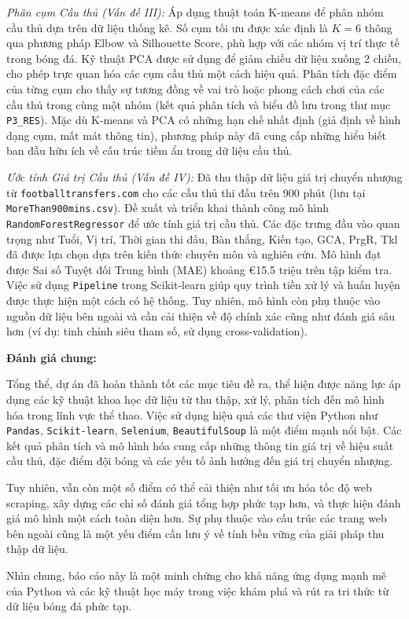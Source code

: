 \documentclass[12pt]{report}
\begin{document}
{\vspace{0.5em}
\noindent
\textit{Phân cụm Cầu thủ (Vấn đề III):} Áp dụng thuật toán K-means để phân nhóm cầu thủ dựa trên dữ liệu thống kê. Số cụm tối ưu được xác định là $K=6$ thông qua phương pháp Elbow và Silhouette Score, phù hợp với các nhóm vị trí thực tế trong bóng đá. Kỹ thuật PCA được sử dụng để giảm chiều dữ liệu xuống 2 chiều, cho phép trực quan hóa các cụm cầu thủ một cách hiệu quả. Phân tích đặc điểm của từng cụm cho thấy sự tương đồng về vai trò hoặc phong cách chơi của các cầu thủ trong cùng một nhóm (kết quả phân tích và biểu đồ lưu trong thư mục \texttt{P3\_RES}). Mặc dù K-means và PCA có những hạn chế nhất định (giả định về hình dạng cụm, mất mát thông tin), phương pháp này đã cung cấp những hiểu biết ban đầu hữu ích về cấu trúc tiềm ẩn trong dữ liệu cầu thủ.

\vspace{0.5em}
\noindent
\textit{Ước tính Giá trị Cầu thủ (Vấn đề IV):} Đã thu thập dữ liệu giá trị chuyển nhượng từ \texttt{footballtransfers.com} cho các cầu thủ thi đấu trên 900 phút (lưu tại \texttt{MoreThan900mins.csv}). Đề xuất và triển khai thành công mô hình \texttt{RandomForestRegressor} để ước tính giá trị cầu thủ. Các đặc trưng đầu vào quan trọng như Tuổi, Vị trí, Thời gian thi đấu, Bàn thắng, Kiến tạo, GCA, PrgR, Tkl đã được lựa chọn dựa trên kiến thức chuyên môn và nghiên cứu. Mô hình đạt được Sai số Tuyệt đối Trung bình (MAE) khoảng €15.5 triệu trên tập kiểm tra. Việc sử dụng \texttt{Pipeline} trong Scikit-learn giúp quy trình tiền xử lý và huấn luyện được thực hiện một cách có hệ thống. Tuy nhiên, mô hình còn phụ thuộc vào nguồn dữ liệu bên ngoài và cần cải thiện về độ chính xác cũng như đánh giá sâu hơn (ví dụ: tinh chỉnh siêu tham số, sử dụng cross-validation).

\vspace{1em}
\noindent
\textbf{Đánh giá chung:}

\vspace{0.5em}
\noindent
Tổng thể, dự án đã hoàn thành tốt các mục tiêu đề ra, thể hiện được năng lực áp dụng các kỹ thuật khoa học dữ liệu từ thu thập, xử lý, phân tích đến mô hình hóa trong lĩnh vực thể thao. Việc sử dụng hiệu quả các thư viện Python như \texttt{Pandas}, \texttt{Scikit-learn}, \texttt{Selenium}, \texttt{BeautifulSoup} là một điểm mạnh nổi bật. Các kết quả phân tích và mô hình hóa cung cấp những thông tin giá trị về hiệu suất cầu thủ, đặc điểm đội bóng và các yếu tố ảnh hưởng đến giá trị chuyển nhượng.

\vspace{0.5em}
\noindent
Tuy nhiên, vẫn còn một số điểm có thể cải thiện như tối ưu hóa tốc độ web scraping, xây dựng các chỉ số đánh giá tổng hợp phức tạp hơn, và thực hiện đánh giá mô hình một cách toàn diện hơn. Sự phụ thuộc vào cấu trúc các trang web bên ngoài cũng là một yếu điểm cần lưu ý về tính bền vững của giải pháp thu thập dữ liệu.

\vspace{0.5em}
\noindent
Nhìn chung, báo cáo này là một minh chứng cho khả năng ứng dụng mạnh mẽ của Python và các kỹ thuật học máy trong việc khám phá và rút ra tri thức từ dữ liệu bóng đá phức tạp.

}
\end{document}
